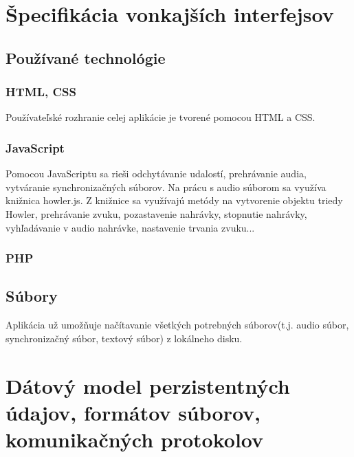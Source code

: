 \documentclass{article}
\begin{document}
\section{Špecifikácia vonkajších interfejsov}

\subsection{Používané technológie}
\subsubsection{HTML, CSS}
Používateľské rozhranie celej aplikácie je tvorené pomocou HTML a CSS.
\subsubsection{JavaScript}
Pomocou JavaScriptu sa rieši odchytávanie udalostí, prehrávanie audia, vytváranie synchronizačných súborov. Na prácu s  audio súborom sa využíva knižnica howler.js. Z knižnice sa využívajú metódy na vytvorenie objektu triedy Howler, prehrávanie zvuku, pozastavenie nahrávky, stopnutie nahrávky, vyhľadávanie v audio nahrávke, nastavenie trvania zvuku...

\subsubsection{PHP}

\subsection{Súbory}
Aplikácia už umožňuje načítavanie všetkých potrebných súborov(t.j. audio súbor, synchronizačný súbor, textový súbor) z lokálneho disku.


\section{Dátový model perzistentných údajov, formátov súborov, komunikačných protokolov}
\end{document}
